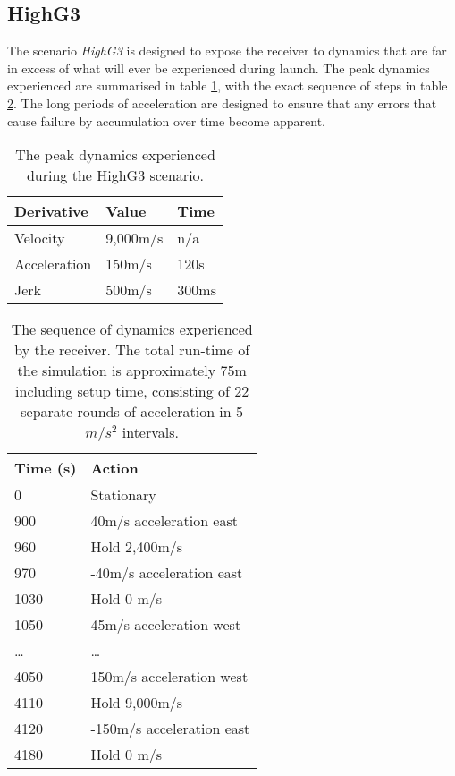 \subsection{HighG3}
The scenario \emph{HighG3} is designed to expose the receiver to dynamics that are far in excess of what will ever be experienced during launch. The peak dynamics experienced are summarised in table \ref{tab:HighG3PeakDynamics}, with the exact sequence of steps in table \ref{tab:HighG3Steps}. The long periods of acceleration are designed to ensure that any errors that cause failure by accumulation over time become apparent. 


\begin{table}[]
\centering
\begin{tabular}{|l|l|l|}
\hline
\rowcolor[HTML]{C0C0C0} 
Derivative   & Value    & Time  \\ \hline
Velocity     & 9,000m/s & n/a   \\ \hline
\rowcolor[HTML]{EFEFEF} 
Acceleration & 150m/s   & 120s  \\ \hline
Jerk         & 500m/s   & 300ms \\ \hline
\end{tabular}
\caption{The peak dynamics experienced during the HighG3 scenario.}
\label{tab:HighG3PeakDynamics}
\end{table}

\begin{table}[]
\centering
\begin{tabular}{|l|l|}
\hline
\rowcolor[HTML]{C0C0C0} 
Time (s) & Action               \\ \hline
0        & Stationary           \\ \hline
\rowcolor[HTML]{EFEFEF} 
900      & 40m/s acceleration east   \\ \hline
960      & Hold 2,400m/s        \\ \hline
\rowcolor[HTML]{EFEFEF} 
970      & -40m/s acceleration east \\ \hline
1030     & Hold 0 m/s           \\ \hline
\rowcolor[HTML]{EFEFEF} 
1050     & 45m/s acceleration  west \\ \hline
\ldots   & \ldots               \\ \hline
\rowcolor[HTML]{EFEFEF} 
4050     & 150m/s acceleration west \\ \hline
4110     & Hold 9,000m/s        \\ \hline
\rowcolor[HTML]{EFEFEF} 
4120     & -150m/s acceleration east\\ \hline
4180     & Hold 0 m/s           \\ \hline
\end{tabular}
\caption{The sequence of dynamics experienced by the receiver. The total run-time of the simulation is approximately 75m including setup time, consisting of 22 separate rounds of acceleration in 5$m/s^2$ intervals.}
\label{tab:HighG3Steps}
\end{table}

